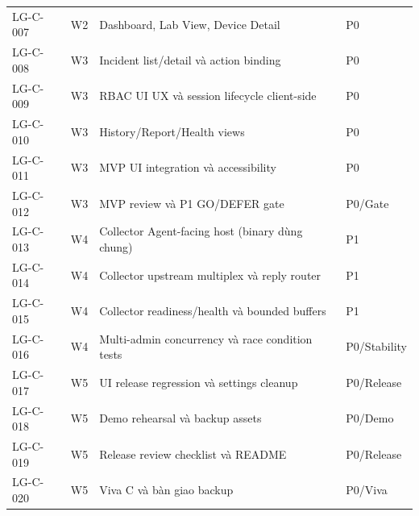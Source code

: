 \begin{longtable}{p{1.5cm} p{0.9cm} p{10.5cm} p{1.6cm}}
LG-C-007 & W2 & Dashboard, Lab View, Device Detail & P0 \\
LG-C-008 & W3 & Incident list/detail và action binding & P0 \\
LG-C-009 & W3 & RBAC UI UX và session lifecycle client-side & P0 \\
LG-C-010 & W3 & History/Report/Health views & P0 \\
LG-C-011 & W3 & MVP UI integration và accessibility & P0 \\
LG-C-012 & W3 & MVP review và P1 GO/DEFER gate & P0/Gate \\
LG-C-013 & W4 & Collector Agent-facing host (binary dùng chung) & P1 \\
LG-C-014 & W4 & Collector upstream multiplex và reply router & P1 \\
LG-C-015 & W4 & Collector readiness/health và bounded buffers & P1 \\
LG-C-016 & W4 & Multi-admin concurrency và race condition tests & P0/Stability \\
LG-C-017 & W5 & UI release regression và settings cleanup & P0/Release \\
LG-C-018 & W5 & Demo rehearsal và backup assets & P0/Demo \\
LG-C-019 & W5 & Release review checklist và README & P0/Release \\
LG-C-020 & W5 & Viva C và bàn giao backup & P0/Viva \\
\bottomrule
\end{longtable}
\endgroup
\normalsize

